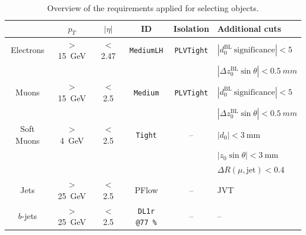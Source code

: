 \begin{table}[!h]
	\scriptsize
	\centering
	\begin{tabular}{cccccl}
		\toprule
		& $p_{T}$ & $|\eta|$ & ID & Isolation & Additional cuts \\
		\midrule
		Electrons & $>$ \SI{15}{\GeV} & $<$ 2.47 & \texttt{MediumLH} & \texttt{PLVTight}  & $|d_0^\mathrm{BL}~\mathrm{significance} | < 5$ \\
		& & & & & $|\Delta z_0^\mathrm{BL} \sin\theta| < \SI{0.5}{mm}$ \\
		\midrule
		Muons & $>$ \SI{15}{\GeV} & $<$ 2.5 & \texttt{Medium} & \texttt{PLVTight}  & $|d_0^\mathrm{BL}~\mathrm{significance} | < 5$ \\
		& & & & & $|\Delta z_0^\mathrm{BL} \sin\theta| < \SI{0.5}{mm}$ \\
		\midrule
		Soft Muons & $>$ \SI{4}{\GeV} & $<$ 2.5 & \texttt{Tight} & -- & $|d_0| < \SI{3}{\milli\metre}$ \\
		& & & & & $|z_0 \sin\theta| < \SI{3}{\milli\metre}$ \\
		& & & & & $\Delta R(\mu,\mathrm{jet}) < 0.4$ \\
		\midrule
		Jets & $>$ \SI{25}{\GeV} & $<$ 2.5 & PFlow & --  & JVT \\
		\midrule
		$b$-jets & $>$ \SI{25}{\GeV} & $<$ 2.5 & \texttt{DL1r @\SI{77}{\%}} & --  & --\\
		\bottomrule
	\end{tabular}
	\caption{\normalsize{Overview of the requirements applied for selecting objects.}}
	\label{tab:objects}
\end{table}


\FloatBarrier
